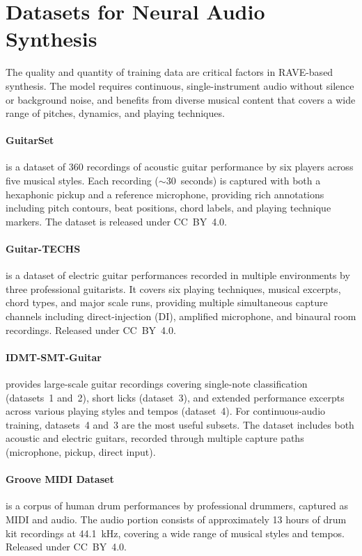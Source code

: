\section{Datasets for Neural Audio Synthesis}
\label{sec:sota_datasets}

The quality and quantity of training data are critical factors in RAVE-based synthesis. The model requires continuous, single-instrument audio without silence or background noise, and benefits from diverse musical content that covers a wide range of pitches, dynamics, and playing techniques.

\paragraph{GuitarSet}
\cite{xi2018guitarset} is a dataset of 360 recordings of acoustic guitar performance by six players across five musical styles. Each recording ($\sim$30~seconds) is captured with both a hexaphonic pickup and a reference microphone, providing rich annotations including pitch contours, beat positions, chord labels, and playing technique markers. The dataset is released under CC~BY~4.0.

\paragraph{Guitar-TECHS}
is a dataset of electric guitar performances recorded in multiple environments by three professional guitarists. It covers six playing techniques, musical excerpts, chord types, and major scale runs, providing multiple simultaneous capture channels including direct-injection (DI), amplified microphone, and binaural room recordings. Released under CC~BY~4.0.

\paragraph{IDMT-SMT-Guitar}
\cite{kehling2014idmtsmtguitar} provides large-scale guitar recordings covering single-note classification (datasets~1 and~2), short licks (dataset~3), and extended performance excerpts across various playing styles and tempos (dataset~4). For continuous-audio training, datasets~4 and~3 are the most useful subsets. The dataset includes both acoustic and electric guitars, recorded through multiple capture paths (microphone, pickup, direct input).

\paragraph{Groove MIDI Dataset}
\cite{gillick2019groove} is a corpus of human drum performances by professional drummers, captured as MIDI and audio. The audio portion consists of approximately 13 hours of drum kit recordings at 44.1~kHz, covering a wide range of musical styles and tempos. Released under CC~BY~4.0.

